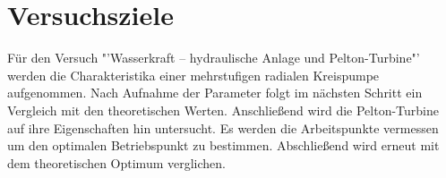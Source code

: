 \section{Versuchsziele}
Für den Versuch "'Wasserkraft – hydraulische Anlage und Pelton-Turbine"' werden die Charakteristika einer mehrstufigen radialen Kreispumpe aufgenommen. Nach Aufnahme der Parameter folgt im nächsten Schritt ein Vergleich mit den theoretischen Werten. Anschließend wird die Pelton-Turbine auf ihre Eigenschaften hin untersucht. Es werden die Arbeitspunkte vermessen um den optimalen Betriebspunkt zu bestimmen. Abschließend wird erneut mit dem theoretischen Optimum verglichen.
